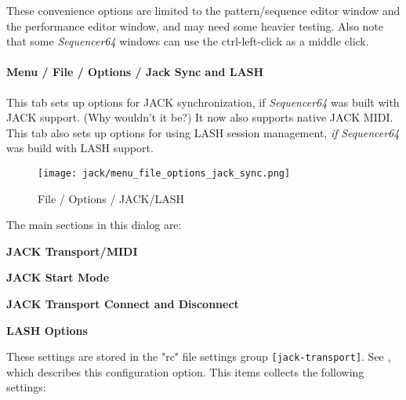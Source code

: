    These convenience options are limited to the
   pattern/sequence editor window and the performance editor window, and may
   need some heavier testing.  Also note that some \textsl{Sequencer64} windows
   can use the ctrl-left-click as a middle click. 
 
\paragraph{Menu / File / Options / Jack Sync and LASH}
\label{paragraph:seq64_menu_file_options_jack_sync}

   This tab sets up options for JACK synchronization, if \textsl{Sequencer64}
   was built with JACK support.  (Why wouldn't it be?)
   It now also supports native JACK MIDI.
   This tab also sets up options for using LASH session management, \textsl{if}
   \textsl{Sequencer64} was build with LASH support.

\begin{figure}[H]
   \centering 
   \texttt{[image: jack/menu\_file\_options\_jack\_sync.png]}
   \caption{File / Options / JACK/LASH}
   \label{fig:seq64_menu_file_options_jack_sync}
\end{figure}

   The main sections in this dialog are:

   \begin{enumber}
      \item \textbf{JACK Transport/MIDI}
      \item \textbf{JACK Start Mode}
      \item \textbf{JACK Transport Connect and Disconnect}
      \item \textbf{LASH Options}
   \end{enumber}

   \setcounter{ItemCounter}{0}      %

   These settings are stored in the "rc" file settings group
   \texttt{[jack-transport]}.
   See ,
   which describes this configuration option.
   This items collects the following settings:

